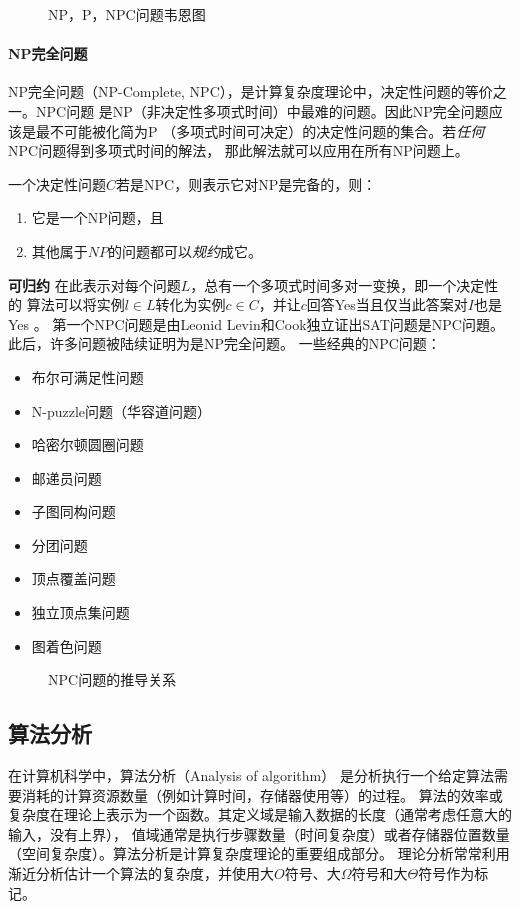 \begin{figure}[H]
        \caption{NP，P，NPC问题韦恩图}
        \centering
        
\end{figure}

\paragraph{NP完全问题}
NP完全问题（NP-Complete, NPC），是计算复杂度理论中，决定性问题的等价之一。NPC问题
是NP（非决定性多项式时间）中最难的问题。因此NP完全问题应该是最不可能被化简为P
（多项式时间可决定）的决定性问题的集合。若\emph{任何}NPC问题得到多项式时间的解法，
那此解法就可以应用在所有NP问题上。

一个决定性问题$C$若是NPC，则表示它对NP是完备的，则：
\begin{enumerate}
        \item 它是一个NP问题，且
        \item 其他属于$NP$的问题都可以\emph{规约}成它。
\end{enumerate}
\textbf{可归约} 在此表示对每个问题$L$，总有一个多项式时间多对一变换，即一个决定性的
算法可以将实例$ l \in L $转化为实例$ c \in C $，并让$c$回答Yes当且仅当此答案对$I$也是
Yes \cite{DBLP:journals/jacm/Ladner75}。
第一个NPC问题是由Leonid Levin和Cook独立证出SAT问题是NPC问題\cite{DBLP:conf/stoc/Cook71}。
此后，许多问题被陆续证明为是NP完全问题。
一些经典的NPC问题：
\begin{itemize}
        \item 布尔可满足性问题
        \item N-puzzle问题（华容道问题）
        \item 哈密尔顿圆圈问题
        \item 邮递员问题
        \item 子图同构问题
        \item 分团问题
        \item 顶点覆盖问题
        \item 独立顶点集问题
        \item 图着色问题
\end{itemize}

\begin{figure}[H]
        \caption{NPC问题的推导关系}
        \centering
        
\end{figure}

\subsection{算法分析}
在计算机科学中，算法分析（Analysis of algorithm）
是分析执行一个给定算法需要消耗的计算资源数量（例如计算时间，存储器使用等）的过程\cite{DBLP:books/daglib/0023376}。
算法的效率或复杂度在理论上表示为一个函数。其定义域是输入数据的长度（通常考虑任意大的输入，没有上界），
值域通常是执行步骤数量（时间复杂度）或者存储器位置数量（空间复杂度）。算法分析是计算复杂度理论的重要组成部分。
理论分析常常利用渐近分析估计一个算法的复杂度，并使用大$O$符号、大$\Omega$符号和大$\Theta$符号作为标记。

